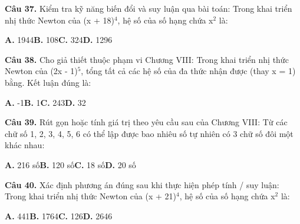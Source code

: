 \documentclass[11pt,a4paper]{article}
\begin{document}
\textbf{\color{primary} Câu 37.} Kiểm tra kỹ năng biến đổi và suy luận qua bài toán: Trong khai triển nhị thức Newton của (x + 18)$^4$, hệ số của số hạng chứa x$^2$ là:\par
\hspace*{1.5em}\textbf{A.} 1944\quad\quad \textbf{B.} 108\quad\quad \textbf{C.} 324\quad\quad \textbf{D.} 1296\par\vspace{2pt}
\textbf{\color{primary} Câu 38.} Cho giả thiết thuộc phạm vi Chương VIII: Trong khai triển nhị thức Newton của (2x - 1)$^5$, tổng tất cả các hệ số của đa thức nhận được (thay x = 1) bằng. Kết luận đúng là:\par
\hspace*{1.5em}\textbf{A.} -1\quad\quad \textbf{B.} 1\quad\quad \textbf{C.} 243\quad\quad \textbf{D.} 32\par\vspace{2pt}
\textbf{\color{primary} Câu 39.} Rút gọn hoặc tính giá trị theo yêu cầu sau của Chương VIII: Từ các chữ số 1, 2, 3, 4, 5, 6 có thể lập được bao nhiêu số tự nhiên có 3 chữ số đôi một khác nhau:\par
\hspace*{1.5em}\textbf{A.} 216 số\quad\quad \textbf{B.} 120 số\quad\quad \textbf{C.} 18 số\quad\quad \textbf{D.} 20 số\par\vspace{2pt}
\textbf{\color{primary} Câu 40.} Xác định phương án đúng sau khi thực hiện phép tính / suy luận: Trong khai triển nhị thức Newton của (x + 21)$^4$, hệ số của số hạng chứa x$^2$ là:\par
\hspace*{1.5em}\textbf{A.} 441\quad\quad \textbf{B.} 1764\quad\quad \textbf{C.} 126\quad\quad \textbf{D.} 2646\par\vspace{2pt}
\end{document}
